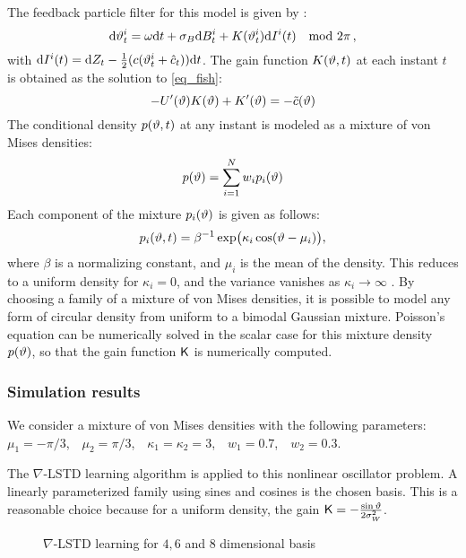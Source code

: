 The feedback particle filter for this model is given by :
\begin{equation*}
\text{d} \vartheta^{i}_t = \omega \text{d} t
+\sigma_{B}\text{d} B^{i}_t+K(\vartheta^{i}_t) \text{d} I^i(t)  \quad  \text{mod }2\pi\, ,
\end{equation*}
with $\text{d} I^i(t) = \text{d} Z_t-\frac{1}{2}(c(\vartheta_t^{i}+{\hat c}_t))\text{d} t$.
The gain function $K(\vartheta,t)$ at each instant $t$ is obtained as the solution to \eqref{eq_fish}:
\begin{equation*}
- U'(\oscState) K(\oscState) + K'(\oscState) = -\tilc(\oscState)  %
\end{equation*}
The conditional density $p(\vartheta,t)$ at any instant is modeled as a mixture of von Mises densities:
\begin{equation*}
p(\vartheta)=\sum_{i=1}^{N}w_{i}p_{i}(\vartheta)
\end{equation*}
Each component of the mixture $p_{i}(\vartheta)$ is given as follows:
\begin{equation*}
p_{i}(\vartheta,t) =  \beta^{-1} \exp  \bigl( \kappa_i \cos(\vartheta-\mu_{i} )    \bigr),
\end{equation*}
where $\beta$ is a normalizing constant, and $\mu_{i}$ is the mean of the density. This reduces to   a uniform density for $\kappa_{i}=0$, and the variance vanishes as $\kappa_{i}\to \infty$ \cite{haspea00}. By choosing a family of a mixture of von Mises densities, it is possible to model any form of circular density from uniform to a bimodal Gaussian mixture.
Poisson's equation can be numerically solved in the scalar case for this mixture density $p(\vartheta)$, so that the gain function $\text{\sf K}$ is numerically computed.

\subsubsection*{Simulation results}
We consider a mixture of von Mises densities with the following parameters: $\mu_1 = -\pi/3$,\ \
$\mu_2 = \pi/3$,\ \
$\kappa_1=\kappa_2=3$,\ \
$w_1 =0.7$,\ \
$w_2 =0.3$.


The $\nabla$-LSTD learning algorithm is applied to this nonlinear oscillator problem. A linearly parameterized family using sines and cosines is the chosen basis. This is a reasonable choice because for a uniform density, the gain $\text{\sf K}=-\frac{\sin \vartheta}{2\sigma_{W}^{2}}$.

\begin{figure*}
	\caption{$\nabla$-LSTD learning for $4,6$ and $8$ dimensional basis}
	\label{f:qad468}
\end{figure*}

